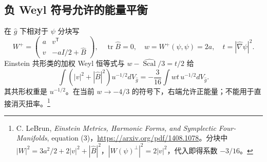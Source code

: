\documentclass[UTF8,fontset=fandol,zihao=-4,oneside,openany]{ctexbook}
\theoremstyle{cjkplain}
\numberwithin{equation}{chapter}
\begin{document}
\subsection{负 Weyl 符号允许的能量平衡}
在 $\widehat g$ 下相对于 $\psi$ 分块写
\[
W^+=\begin{pmatrix}a&v^{\mathsf T}\\v&-aI/2+\widehat B\end{pmatrix},
\quad\operatorname{tr}\widehat B=0,\quad w=W^+(\psi,\psi)=2a,
\quad t=|\widehat\nabla\psi|^2.
\]
Einstein 共形类的加权 Weyl 恒等式与 $w-\widehat{\operatorname{Scal}}/3=t/2$ 给
\begin{equation}\label{GAU:weighted-Weyl}
\int (|v|^2+|\widehat B|^2)u^{-1/2}dV_{\widehat g}
=-\frac3{16}\int wt\,u^{-1/2}dV_{\widehat g}.
\end{equation}
其共形权重是 $u^{-1/2}$。在当前 $w\to-4/3$ 的符号下，右端允许正能量；不能用于直接消灭扭率。\footnote{C. LeBrun, \emph{Einstein Metrics, Harmonic Forms, and Symplectic Four-Manifolds}, equation (3)，\url{https://arxiv.org/pdf/1408.1078}。分块中 $|W|^2=3a^2/2+2|v|^2+|\widehat B|^2$，$|W(\psi)^\perp|^2=2|v|^2$，代入即得系数 $-3/16$。}
\end{document}
